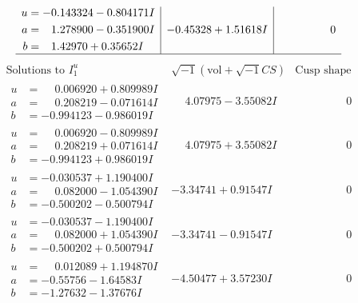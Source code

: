 \documentclass[1p]{elsarticle_modified}
\theoremstyle{definition}
\newcommand{\I}{\sqrt{-1}}
\begin{document}
$$\begin{array}{c|c|c}
\begin{aligned}
u &= -0.143324 - 0.804171 I \\
a &= \phantom{-}1.278900 - 0.351900 I \\
b &= \phantom{-}1.42970 + 0.35652 I\end{aligned}
 & -0.45328 + 1.51618 I & \phantom{-0.000000 } 0\\
 \hline 
 \end{array}$$\newpage$$\begin{array}{c|c|c}  
\text{Solutions to }I^u_{1}& \I (\text{vol} + \sqrt{-1}CS) & \text{Cusp shape}\\
 \hline 
\begin{aligned}
u &= \phantom{-}0.006920 + 0.809989 I \\
a &= \phantom{-}0.208219 - 0.071614 I \\
b &= -0.994123 - 0.986019 I\end{aligned}
 & \phantom{-}4.07975 - 3.55082 I & \phantom{-0.000000 } 0 \\ \hline\begin{aligned}
u &= \phantom{-}0.006920 - 0.809989 I \\
a &= \phantom{-}0.208219 + 0.071614 I \\
b &= -0.994123 + 0.986019 I\end{aligned}
 & \phantom{-}4.07975 + 3.55082 I & \phantom{-0.000000 } 0 \\ \hline\begin{aligned}
u &= -0.030537 + 1.190400 I \\
a &= \phantom{-}0.082000 - 1.054390 I \\
b &= -0.500202 - 0.500794 I\end{aligned}
 & -3.34741 + 0.91547 I & \phantom{-0.000000 } 0 \\ \hline\begin{aligned}
u &= -0.030537 - 1.190400 I \\
a &= \phantom{-}0.082000 + 1.054390 I \\
b &= -0.500202 + 0.500794 I\end{aligned}
 & -3.34741 - 0.91547 I & \phantom{-0.000000 } 0 \\ \hline\begin{aligned}
u &= \phantom{-}0.012089 + 1.194870 I \\
a &= -0.55756 - 1.64583 I \\
b &= -1.27632 - 1.37676 I\end{aligned}
 & -4.50477 + 3.57230 I & \phantom{-0.000000 } 0 \\ \hline\begin{aligned}

\end{aligned}
\end{array}$$
\end{document}
